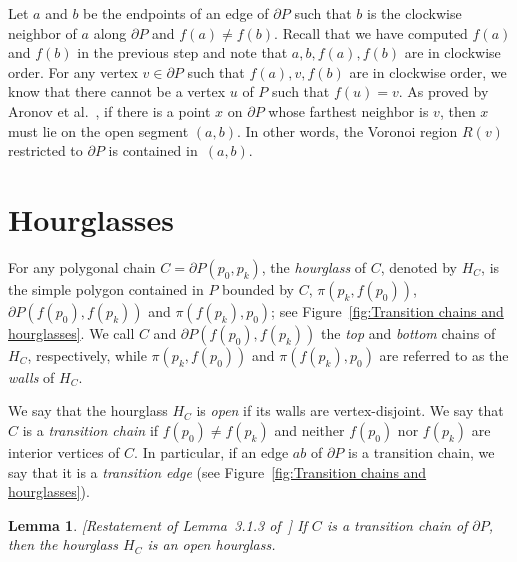 \documentclass[a4paper]{article}
\newtheorem{lemma}[theorem]{Lemma}
\newcommand{\ff}[1]{\ensuremath{f(#1)}}
\newcommand{\p}[2]{\ensuremath{\pi(#1, #2)}}
\begin{document}
Let $a$ and $b$ be the endpoints of an edge of $\partial P$ such that 
$b$ is the clockwise neighbor of $a$ along $\partial P$ and $\ff{a}\neq \ff{b}$.
Recall that we have computed $\ff{a}$ and $\ff{b}$ in the previous step and note that $a,b, \ff{a}, \ff{b}$ are in clockwise order.  
For any vertex $v\in \partial P$ such that  $\ff{a}, v, \ff{b}$ are in clockwise order, we know that there cannot be a vertex $u$ of $P$ such that $\ff{u} = v$.
As proved by Aronov et al.~\cite[Corollary 2.7.4]{aronov1993furthest}, 
if there is a point $x$ on $\partial P$ whose farthest neighbor is $v$, then $x$ must lie on the open segment $(a,b)$. 
In other words, the Voronoi region $R(v)$ restricted to $\partial P$ is contained in~$(a,b)$.


\section{Hourglasses}\label{Section: Building hourglasses}

For any polygonal chain $C= \partial P(p_0, p_k)$, the \emph{hourglass} of $C$, denoted by $H_C$, is the simple polygon contained in $P$ bounded by $C$, $\p{p_k}{\ff{p_0}}$, $\partial P(\ff{p_0}, \ff{p_k})$ and $\p{\ff{p_k}}{ p_0}$; see Figure~\ref{fig:Transition chains and hourglasses}. 
We call $C$ and $\partial P(\ff{p_0}, \ff{p_k})$ the \emph{top} and \emph{bottom} chains of $H_C$, respectively, while $\p{p_k}{ \ff{p_0}}$ and $\p{\ff{p_k}}{p_0}$ are referred to as the \emph{walls} of $H_C$.


We say that the hourglass $H_C$ is \emph{open} if its walls are vertex-disjoint. 
We say that $C$ is a \emph{transition chain} if $\ff{p_0} \neq \ff{p_k}$ and neither $\ff{p_0}$ nor $\ff{p_k}$ are interior vertices of $C$. In particular, if an edge $ab$ of $\partial P$ is a transition chain, we say that it is a \emph{transition edge} (see Figure~\ref{fig:Transition chains and hourglasses}).

\begin{lemma}\label{lemma:Transition hourglasses are open}
[Restatement of Lemma~3.1.3 of~\cite{aronov1993furthest}] 
If $C$ is a transition chain of $\partial P$, then the hourglass $H_C$ is an open hourglass.
\end{lemma}
\end{document}

